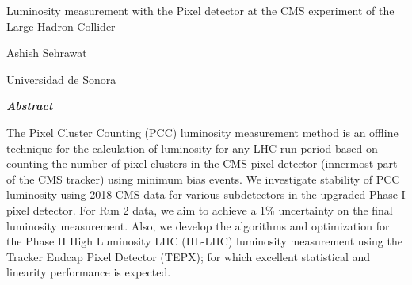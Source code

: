 \documentclass[final,3p]{CSP}
\def\Student{Ashish Sehrawat}
\def\Universidad{Universidad de Sonora}
\def\ProjectTitle{Luminosity measurement with the Pixel detector at the CMS experiment of the Large Hadron Collider }
\begin{document}
\begin{adjustwidth}{1cm}{1cm}

  \begin{center}
    {\Large \ProjectTitle \par}
    \vspace{0.5cm}

    {\Student \par}
    {\Universidad \par}  
    \vspace{1cm}
    
    {\itshape\textbf{Abstract}\par}
     \vspace{0.7 cm}
        
    \end{center}  

 
  \onehalfspacing The Pixel Cluster Counting (PCC) luminosity measurement method is an offline technique for the calculation of luminosity for any LHC run period based on counting the number of pixel clusters in the CMS pixel detector (innermost part of the CMS tracker) using minimum bias events. We investigate stability of PCC luminosity using 2018 CMS data for various subdetectors in the upgraded Phase I pixel detector. For Run 2 data, we aim to achieve a 1\% uncertainty on the final luminosity measurement. Also, we develop the algorithms and optimization for the Phase II High Luminosity LHC (HL-LHC) luminosity measurement using the Tracker Endcap Pixel Detector (TEPX); for which excellent statistical and linearity performance is expected.


    
\end{adjustwidth}

\hspace{2pt}
\vspace{1 cm}

\clearpage
\shipout\null


\newpage
\tableofcontents

\clearpage
\newpage





















\cleardoublepage
\onehalfspacing


\end{document}
